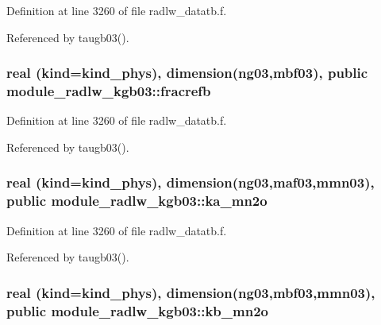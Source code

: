 Definition at line 3260 of file radlw\+\_\+datatb.\+f.



Referenced by taugb03().

\subsubsection[{\texorpdfstring{fracrefb}{fracrefb}}]{\setlength{\rightskip}{0pt plus 5cm}real (kind=kind\+\_\+phys), dimension(ng03,{\bf mbf03}), public module\+\_\+radlw\+\_\+kgb03\+::fracrefb}\hypertarget{namespacemodule__radlw__kgb03_af1d33a7362e73bf40ef592bc9863b612}{}\label{namespacemodule__radlw__kgb03_af1d33a7362e73bf40ef592bc9863b612}


Definition at line 3260 of file radlw\+\_\+datatb.\+f.



Referenced by taugb03().

\subsubsection[{\texorpdfstring{ka\+\_\+mn2o}{ka_mn2o}}]{\setlength{\rightskip}{0pt plus 5cm}real (kind=kind\+\_\+phys), dimension(ng03,{\bf maf03},{\bf mmn03}), public module\+\_\+radlw\+\_\+kgb03\+::ka\+\_\+mn2o}\hypertarget{namespacemodule__radlw__kgb03_aeeba4e0a8fc97c557e1127b4d5d1bd94}{}\label{namespacemodule__radlw__kgb03_aeeba4e0a8fc97c557e1127b4d5d1bd94}


Definition at line 3260 of file radlw\+\_\+datatb.\+f.



Referenced by taugb03().

\subsubsection[{\texorpdfstring{kb\+\_\+mn2o}{kb_mn2o}}]{\setlength{\rightskip}{0pt plus 5cm}real (kind=kind\+\_\+phys), dimension(ng03,{\bf mbf03},{\bf mmn03}), public module\+\_\+radlw\+\_\+kgb03\+::kb\+\_\+mn2o}\hypertarget{namespacemodule__radlw__kgb03_aa2442e663e83b222648a86a34cd6631c}{}\label{namespacemodule__radlw__kgb03_aa2442e663e83b222648a86a34cd6631c}


